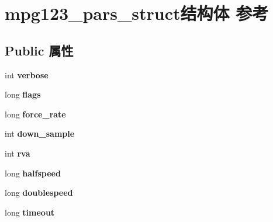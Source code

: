 \hypertarget{structmpg123__pars__struct}{}\section{mpg123\+\_\+pars\+\_\+struct结构体 参考}
\label{structmpg123__pars__struct}
\subsection*{Public 属性}
\begin{DoxyCompactItemize}
\item 
\mbox{\label{structmpg123__pars__struct_acf2c8fa9383c9ff4008099baee4b9c63}} 
int {\bfseries verbose}
\item 
\mbox{\label{structmpg123__pars__struct_aa5934cc3fafdffba029e27cc6c4a2fbf}} 
long {\bfseries flags}
\item 
\mbox{\label{structmpg123__pars__struct_a4d1f00ba15f1743d7d57fd1a3c322664}} 
long {\bfseries force\+\_\+rate}
\item 
\mbox{\label{structmpg123__pars__struct_acc5565544a8bcccffc924ba95a2396f5}} 
int {\bfseries down\+\_\+sample}
\item 
\mbox{\label{structmpg123__pars__struct_a37471217b8b1d108a96e2199311fb3ad}} 
int {\bfseries rva}
\item 
\mbox{\label{structmpg123__pars__struct_a3f80cc3f449788894319eb348e767aee}} 
long {\bfseries halfspeed}
\item 
\mbox{\label{structmpg123__pars__struct_a2f7ecadcd88ec1a590092d46f1f2c1ce}} 
long {\bfseries doublespeed}
\item 
\mbox{\label{structmpg123__pars__struct_a6dc17030c3a824821773bd79439282b2}} 
long {\bfseries timeout}
\item 
\mbox{\label{structmpg123__pars__struct_acbfb6d98ceb7333df6989e429cf8151f}} 

\end{DoxyCompactItemize}
